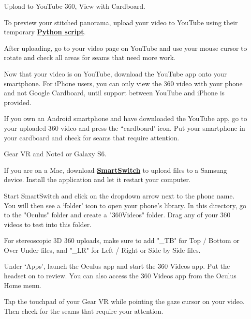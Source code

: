 \begin{fullwidth}
\clearpage
{\large Upload to YouTube 360, View with Cardboard. \par}

To preview your stitched panorama, upload your video to YouTube using their temporary \textbf{\href{https://www.youtube.com/watch?v=Z8VlD2rtACA}{Python script}}.

After uploading, go to your video page on YouTube and use your mouse cursor to rotate and check all areas for seams that need more work.

Now that your video is on YouTube, download the YouTube app onto your smartphone. For iPhone users, you can only view the 360 video with your phone and not Google Cardboard, until support between YouTube and iPhone is provided.

If you own an Android smartphone and have downloaded the YouTube app, go to your uploaded 360 video and press the “cardboard’ icon. Put your smartphone in your cardboard and check for seams that require attention.

{\large Gear VR and Note4 or Galaxy S6. \par}

If you are on a Mac, download \textbf{\href{https://www.dropbox.com/sh/8kqte3wtyt3vltu/AAAjUnNxtXhaxprWF8_q9zbCa?dl=0}{SmartSwitch}} to upload files to a Samsung device. Install the application and let it restart your computer.

Start SmartSwitch and click on the dropdown arrow next to the phone name. You will then see a ‘folder’ icon to open your phone's library. In this directory, go to the "Oculus" folder and create a "360Videos" folder. Drag any of your 360 videos to test into this folder.

\tip For stereoscopic 3D 360 uploads, make sure to add "\_TB" for Top / Bottom or Over Under files, and "\_LR" for Left / Right or Side by Side files.


\clearpage

Under ‘Apps’, launch the Oculus app and start the 360 Videos app. Put the headset on to review. You can also access the 360 Videos app from the Oculus Home menu.


Tap the touchpad of your Gear VR while pointing the gaze cursor on your video. Then check for the seams that require your attention.

\clearpage
\end{fullwidth}